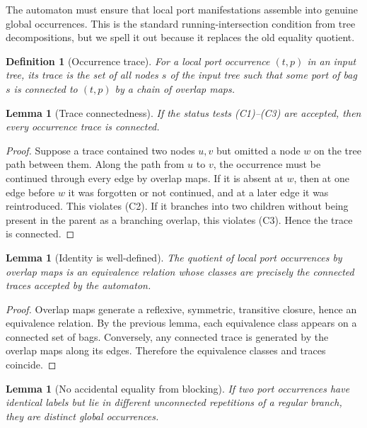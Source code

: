 \documentclass[11pt]{article}
\newtheorem{lemma}[theorem]{Lemma}
\newtheorem{definition}[theorem]{Definition}
\begin{document}
The automaton must ensure that local port manifestations assemble into genuine global occurrences.  This is the standard running-intersection condition from tree decompositions, but we spell it out because it replaces the old equality quotient.

\begin{definition}[Occurrence trace]
For a local port occurrence $(t,p)$ in an input tree, its trace is the set of all nodes $s$ of the input tree such that some port of bag $s$ is connected to $(t,p)$ by a chain of overlap maps.
\end{definition}

\begin{lemma}[Trace connectedness]
If the status tests (C1)--(C3) are accepted, then every occurrence trace is connected.
\end{lemma}

\begin{proof}
Suppose a trace contained two nodes $u,v$ but omitted a node $w$ on the tree path between them.  Along the path from $u$ to $v$, the occurrence must be continued through every edge by overlap maps.  If it is absent at $w$, then at one edge before $w$ it was forgotten or not continued, and at a later edge it was reintroduced.  This violates (C2).  If it branches into two children without being present in the parent as a branching overlap, this violates (C3).  Hence the trace is connected.
\end{proof}

\begin{lemma}[Identity is well-defined]
The quotient of local port occurrences by overlap maps is an equivalence relation whose classes are precisely the connected traces accepted by the automaton.
\end{lemma}

\begin{proof}
Overlap maps generate a reflexive, symmetric, transitive closure, hence an equivalence relation.  By the previous lemma, each equivalence class appears on a connected set of bags.  Conversely, any connected trace is generated by the overlap maps along its edges.  Therefore the equivalence classes and traces coincide.
\end{proof}

\begin{lemma}[No accidental equality from blocking]
If two port occurrences have identical labels but lie in different unconnected repetitions of a regular branch, they are distinct global occurrences.
\end{lemma}
\end{document}
